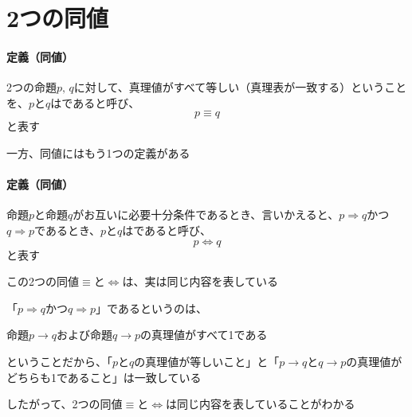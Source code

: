 \documentclass[../book_ronri-and-set]{subfiles}
\begin{document}
\sectionline
\section{2つの同値}

\begin{oframed}
  \paragraph{定義（同値）}
  2つの命題$p, \, q$に対して、真理値がすべて等しい（真理表が一致する）ということを、$p$と$q$はであると呼び、
  \begin{equation*}
    p \equiv q
  \end{equation*}
  と表す
\end{oframed}

一方、同値にはもう1つの定義がある

\begin{oframed}
  \paragraph{定義（同値）}
  命題$p$と命題$q$がお互いに必要十分条件であるとき、言いかえると、$p \Rightarrow q$かつ$q \Rightarrow p$であるとき、$p$と$q$はであると呼び、
  \begin{equation*}
    p \Leftrightarrow q
  \end{equation*}
  と表す
\end{oframed}

この2つの同値$\equiv$と$\Leftrightarrow$は、実は同じ内容を表している

\br

「$p \Rightarrow q$かつ$q \Rightarrow p$」であるというのは、

\begin{shaded*}
  命題$p \to q$および命題$q \to p$の真理値がすべて1である
\end{shaded*}

ということだから、「$p$と$q$の真理値が等しいこと」と「$p \to q$と$q \to p$の真理値がどちらも1であること」は一致している

\br

したがって、2つの同値$\equiv$と$\Leftrightarrow$は同じ内容を表していることがわかる
\end{document}
